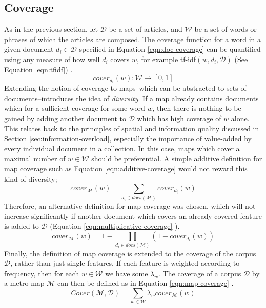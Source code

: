\subsection{Coverage}
As in the previous section, let $\mathcal{D}$ be a set of articles, and $\mathcal{W}$ be a set of words or phrases of which the articles are composed. The coverage function for a word in a given document $d_i \in \mathcal{D}$ specified in Equation \ref{eqn:doc-coverage} can be quantified using any measure of how well $d_i$ covers $w$, for example tf-idf$(w, d_i, \mathcal{D})$ (See Equation \ref{eqn:tfidf}) \citep{GeneratingInformationMaps}.
\begin{equation}
	cover_{d_i}(w) : \mathcal{W} \rightarrow [0,1]
	\label{eqn:doc-coverage}
\end{equation}
Extending the notion of coverage to maps--which can be abstracted to sets of documents--introduces the idea of \textit{diversity}. If a map already contains documents which for a sufficient coverage for some word $w$, then there is nothing to be gained by adding another document to $\mathcal{D}$ which has high coverage of $w$ alone. This relates back to the principles of spatial and information quality discussed in Section \ref{sec:information-overload}, especially the importance of value-added by every individual document in a collection. In this case, maps which cover a maximal number of $w \in \mathcal{W}$ should be preferential. A simple additive definition for map coverage such as Equation \ref{eqn:additive-coverage} \citep{GeneratingInformationMaps} would not reward this kind of diversity;
\begin{equation}
	\label{eqn:additive-coverage}
	cover_\mathcal{M}(w) = \sum_{d_i\in docs(\mathcal{M})}cover_{d_i}(w)
\end{equation}
Therefore, an alternative definition for map coverage was chosen, which will not increase significantly if another document which covers an already covered feature is added to $\mathcal{D}$ (Equation \ref{eqn:multiplicative-coverage} \citep{GeneratingInformationMaps}).
\begin{equation}
	\label{eqn:multiplicative-coverage}
	cover_\mathcal{M}(w) = 1 - \prod_{d_i\in docs(\mathcal{M})}(1-cover_{d_i}(w))
\end{equation}
Finally, the definition of map coverage is extended to the coverage of the corpus $\mathcal{D}$, rather than just single features. If each feature is weighted according to frequency, then for each $w \in \mathcal{W}$ we have some $\lambda_w$. The coverage of a corpus $\mathcal{D}$ by a metro map $\mathcal{M}$ can then be defined as in Equation \ref{eqn:map-coverage} \citep{GeneratingInformationMaps}.
\begin{equation}
	\label{eqn:map-coverage}
	Cover(\mathcal{M}, \mathcal{D}) = \sum_{w \in \mathcal{W}}\lambda_w cover_\mathcal{M}(w)
\end{equation}

